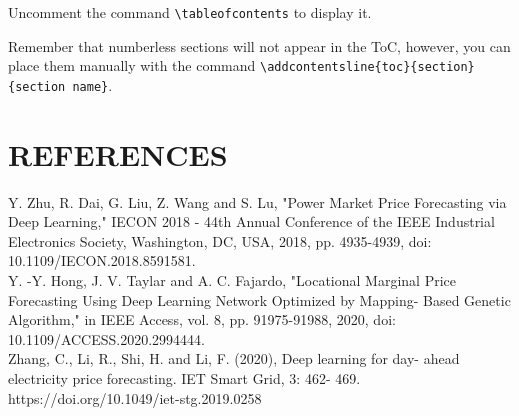 \documentclass[9pt,a4paper,twoside]{rho}
\begin{document}
Uncomment the command \verb|\tableofcontents| to display it.

Remember that numberless sections will not appear in the ToC, however, you can place them manually with the command \verb|\addcontentsline{toc}{section}{section name}|.

\section*{REFERENCES}
	
Y. Zhu, R. Dai, G. Liu, Z. Wang and S. Lu, "Power Market Price
Forecasting via Deep Learning,"
IECON 2018 - 44th Annual
Conference of the IEEE Industrial Electronics Society, Washington,
DC, USA, 2018, pp. 4935-4939, doi: 10.1109/IECON.2018.8591581.\\

\noindent Y. -Y. Hong, J. V. Taylar and A. C. Fajardo, "Locational Marginal Price
Forecasting Using Deep Learning Network Optimized by Mapping-
Based Genetic Algorithm," in
IEEE Access, vol. 8, pp. 91975-91988,
2020, doi: 10.1109/ACCESS.2020.2994444.\\

\noindent Zhang, C., Li, R., Shi, H. and Li, F. (2020), Deep learning for day-
ahead electricity price forecasting. IET Smart Grid, 3: 462-
469. https://doi.org/10.1049/iet-stg.2019.0258

	
\end{document}
